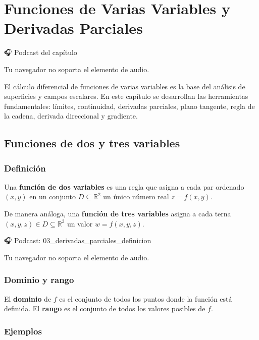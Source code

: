 \documentclass[
]{book}
\begin{document}
\chapter{Funciones de Varias Variables y Derivadas Parciales}\label{derivadas-parciales}

🎧 Podcast del capítulo

Tu navegador no soporta el elemento de audio.

El cálculo diferencial de funciones de varias variables es la base del análisis de superficies y campos escalares. En este capítulo se desarrollan las herramientas fundamentales: límites, continuidad, derivadas parciales, plano tangente, regla de la cadena, derivada direccional y gradiente.

\section{Funciones de dos y tres variables}\label{funciones-de-dos-y-tres-variables}

\subsection{Definición}\label{definiciuxf3n-2}

Una \textbf{función de dos variables} es una regla que asigna a cada par ordenado \((x, y)\) en un conjunto \(D \subseteq \mathbb{R}^2\) un único número real \(z = f(x, y)\).

De manera análoga, una \textbf{función de tres variables} asigna a cada terna \((x, y, z) \in D \subseteq \mathbb{R}^3\) un valor \(w = f(x, y, z)\).

🎧 Podcast: 03\_derivadas\_parciales\_definicion

Tu navegador no soporta el elemento de audio.

\subsection{Dominio y rango}\label{dominio-y-rango}

El \textbf{dominio} de \(f\) es el conjunto de todos los puntos donde la función está definida. El \textbf{rango} es el conjunto de todos los valores posibles de \(f\).

\subsection{Ejemplos}\label{ejemplos}
\end{document}
